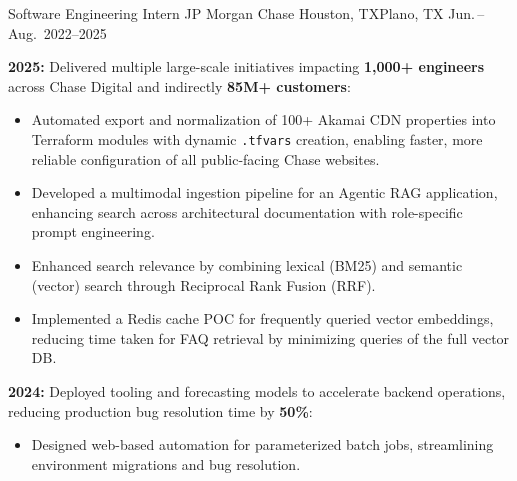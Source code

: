 

\begin{cventries}
\cventry
    {Software Engineering Intern} %
    {JP Morgan Chase} %
    {Houston, TX\newline Plano, TX} %
    {Jun.\,--\,Aug.\ 2022--2025} %
    {
        \begin{cvitems}
          \item {\textbf{2025:} Delivered multiple large-scale initiatives impacting \textbf{1,000+ engineers} across Chase Digital and indirectly \textbf{85M+ customers}:
          \begin{itemize}
            \item Automated export and normalization of 100+ Akamai CDN properties into Terraform modules with dynamic \texttt{.tfvars} creation, enabling faster, more reliable configuration of all public-facing Chase websites.
            \item Developed a multimodal ingestion pipeline for an Agentic RAG application, enhancing search across architectural documentation with role-specific prompt engineering.
            \item Enhanced search relevance by combining lexical (BM25) and semantic (vector) search through Reciprocal Rank Fusion (RRF).
            \item Implemented a Redis cache POC for frequently queried vector embeddings, reducing time taken for FAQ retrieval by minimizing queries of the full vector DB.
          \end{itemize}
          }
          \item { \textbf{2024:} Deployed tooling and forecasting models to accelerate backend operations, reducing production bug resolution time by \textbf{50\%}:
          \begin{itemize}
            \item Designed web-based automation for parameterized batch jobs, streamlining environment migrations and bug resolution.

\end{itemize}}
\end{cvitems}}
\end{cventries}
